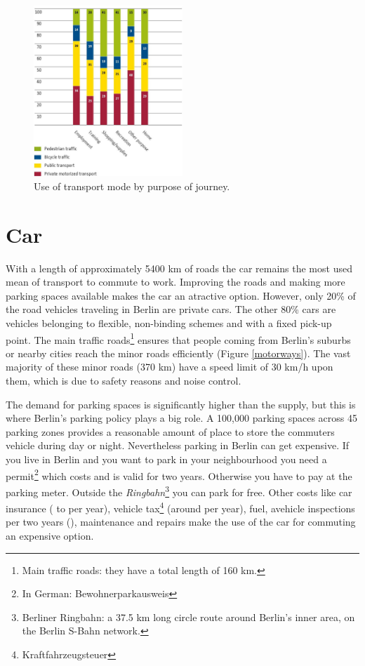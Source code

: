 \begin{figure}[h]
	\includegraphics[width=0.5\textwidth]{MobilityInTheCityJPG/Graphs/UseOfTransportPurpose.jpg}
	\centering
	\caption{Use of transport mode by purpose of journey.\cite{MobilityCity}}
\end{figure}
\section{Car}

With a length of approximately 5400 km of roads the car remains the most used mean of transport to commute to work. Improving the roads and making more parking spaces available makes the car an atractive option. However, only 20\% of the road vehicles traveling in Berlin are private cars. The other 80\% cars are vehicles belonging to flexible, non-binding schemes and with a fixed pick-up point.  The main traffic roads\footnote{Main traffic roads: they have a total length of 160 km.} ensures that people coming from Berlin's suburbs or nearby cities reach the minor roads efficiently (Figure \ref{motorways}). The vast majority of these minor roads (370 km) have a speed limit of 30 km/h upon them, which is due to safety reasons and noise control\cite{MobilityCity}. 

The demand for parking spaces is significantly higher than the supply, but this is where Berlin's parking policy plays a big role. A 100,000 parking spaces across 45 parking zones provides a reasonable amount of place to store the commuters vehicle during day or night. Nevertheless parking in Berlin can get expensive. If you live in Berlin and you want to park in your neighbourhood you need a permit\footnote{In German: Bewohnerparkausweis} which costs  and is valid for two years. Otherwise you have to pay at the parking meter. Outside the \textit{Ringbahn}\footnote{Berliner Ringbahn: a 37.5 km long circle route around Berlin's inner area, on the Berlin S-Bahn network.} you can park for free. Other costs like car insurance ( to  per year), vehicle tax\footnote{Kraftfahrzeugsteuer} (around  per year), fuel, avehicle inspections per two years (), maintenance and repairs make the use of the car for commuting an expensive option\cite{CostCars}.


